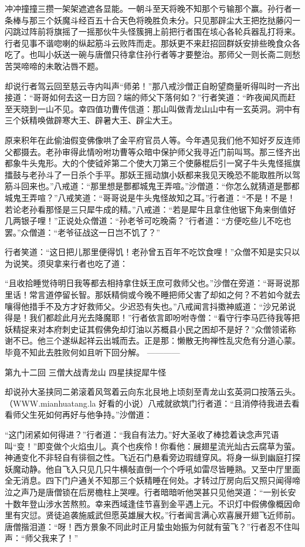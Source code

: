 \documentclass[12pt,UTF8]{ctexbook}
\begin{document}
{	冲冲撞撞三攒一架架遮遮各显能。一朝斗至天将晚不知那个亏输那个赢。孙行者一条棒与那三个妖魔斗经百五十合天色将晚胜负未分。只见那辟尘大王把扢挞藤闪一闪跳过阵前将旗摇了一摇那伙牛头怪簇拥上前把行者围在垓心各轮兵器乱打将来。行者见事不谐唿喇的纵起筋斗云败阵而走。那妖更不来赶招回群妖安排些晚食众各吃了。也叫小妖送一碗与唐僧只待拿住孙行者等才要整治。那师父一则长斋二则愁苦哭啼啼的未敢沾唇不题。
	
	却说行者驾云回至慈云寺内叫声“师弟！”那八戒沙僧正自盼望商量听得叫时一齐出接道：“哥哥如何去这一日方回？端的师父下落何如？”行者笑道：“昨夜闻风而赶至天晓到一山不见。幸四值功曹传信道：那山叫做青龙山山中有一玄英洞。洞中有三个妖精唤做辟寒大王、辟暑大王、辟尘大王。
	
	原来积年在此偷油假变佛像哄了金平府官员人等。今年遇见我们他不知好歹反连师父都摄去。老孙审得此情吩咐功曹等众暗中保护师父我寻近门前叫骂。那三怪齐出都象牛头鬼形。大的个使钺斧第二个使大刀第三个使藤棍后引一窝子牛头鬼怪摇旗擂鼓与老孙斗了一日杀个手平。那妖王摇动旗小妖都来我见天晚恐不能取胜所以驾筋斗回来也。”八戒道：“那里想是酆都城鬼王弄喧。”沙僧道：“你怎么就猜道是酆都城鬼王弄喧？”八戒笑道：“哥哥说是牛头鬼怪故知之耳。”行者道：“不是！不是！若论老孙看那怪是三只犀牛成的精。”八戒道：“若是犀牛且拿住他锯下角来倒值好几两银子哩！”正说处众僧道：“孙老爷可吃晚斋？”行者道：“方便吃些儿不吃也罢。”众僧道：“老爷征战这一日岂不饥了？”
	
	行者笑道：“这日把儿那里便得饥！老孙曾五百年不吃饮食哩！”众僧不知是实只以为说笑。须臾拿来行者也吃了道：
	
	“且收拾睡觉待明日我等都去相持拿住妖王庶可救师父也。”沙僧在旁道：“哥哥说那里话！常言道停留长智。那妖精倘或今晚不睡把师父害了却如之何？不若如今就去嚷得他措手不及方才好救师父。少迟恐有失也。”八戒闻言抖擞神威道：“沙兄弟说得是！我们都趁此月光去降魔耶！”行者依言即吩咐寺僧：“看守行李马匹待我等把妖精捉来对本府刺史证其假佛免却灯油以苏概县小民之困却不是好？”众僧领诺称谢不已。他三个遂纵起祥云出城而去。正是那：懒散无拘禅性乱灾危有分道心蒙。毕竟不知此去胜败何如且听下回分解。
	------------
	
	第九十二回 三僧大战青龙山 四星挟捉犀牛怪
	
	却说孙大圣挟同二弟滚着风驾着云向东北艮地上顷刻至青龙山玄英洞口按落云头。（WWW.mianhuatang.la 好看的小说）八戒就欲筑门行者道：“且消停待我进去看看师父生死如何再好与他争持。”沙僧道：
	
	“这门闭紧如何得进？”行者道：“我自有法力。”好大圣收了棒捻着诀念声咒语叫“变！”即变做个火焰虫儿。真个也疾伶！你看他：展翅星流光灿古云腐草为萤。神通变化不非轻自有徘徊之性。飞近石门悬看旁边瑕缝穿风。将身一纵到幽庭打探妖魔动静。他自飞入只见几只牛横敧直倒一个个呼吼如雷尽皆睡熟。又至中厅里面全无消息。四下门户通关不知那三个妖精睡在何处。才转过厅房向后又照只闻得啼泣之声乃是唐僧锁在后房檐柱上哭哩。行者暗暗听他哭甚只见他哭道：“一别长安十数年登山涉水苦熬煎。幸来西域逢佳节喜到金平遇上元。不识灯中假佛像概因命里有灾愆。贤徒追袭施威武但愿英雄展大权。”行者闻言满心欢喜展开翅飞近师前。唐僧揩泪道：“呀！西方景象不同此时正月蛰虫始振为何就有萤飞？”行者忍不住叫声：“师父我来了！”
	
}
\end{document}

